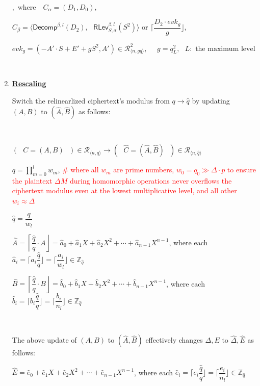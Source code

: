 \begin{tcolorbox}[title={\textbf{\tboxlabel{\ref*{subsubsec:ckks-mult-cipher-summary}} CKKS's Ciphertext-to-Ciphertext Multiplication}}]
\begin{enumerate}
$ $

$, \text{ where } \text{ } C_\alpha = (D
_1, D_0),$

\text{ }\text{ }\text{ }\text{ }\text{ }\text{ }\text{ }\text{ }\text{ } $C_\beta = \bm{\langle} \textsf{Decomp}^{\beta, l}(D_2), \text{ } \textsf{RLev}_{S, \sigma}^{\beta, l}( S^2) \bm{\rangle} \text{ or }   \Bigg\lceil\dfrac{D_2 \cdot \mathit{evk_g}}{g}\Bigg\rfloor$,

\text{ }\text{ }\text{ }\text{ }\text{ }\text{ }\text{ }\text{ }\text{ }  $\mathit{evk_g} = (-A'\cdot S + E' + g S^2, A') \in \mathcal{R}_{\langle n, gq\rangle}^2, \text{ } \text{ } g  = q_L^2, \text{ } L: \text{ the maximum level}$

$ $

\item \textbf{\underline{Rescaling}}

Switch the relinearlized ciphertext's modulus from $q \rightarrow \hat q$ 
by updating $(A, B)$ to $(\hat{A}, \hat B)$ as follows:

$ $

$(\text{ }C = (A, B)\text{ }) \in \mathcal{R}_{\langle n, q \rangle} \rightarrow (\text{ }\hat{C} = (\hat{A}, \hat{B})\text{ }) \in \mathcal{R}_{\langle n, \hat q \rangle}$ 

$q = \prod\limits_{m=0}^{l}w_m$, \textcolor{red}{ \text{ } \# where all $w_m$ are prime numbers,  $w_0 = q_0 \gg \Delta\cdot p$ to ensure the plaintext $\Delta M$ during homomorphic operations never overflows the ciphertext modulus even at the lowest multiplicative level, and all other $w_i \approx \Delta$}

$\hat{q} = \dfrac{q}{w_l}$

$\hat{A} = \left\lceil\dfrac{\hat q}{q}\cdot A\right\rfloor = \hat{a}_{0} + \hat{a}_{1}X + \hat{a}_{2}X^2 + \cdots + \hat{a}_{{n-1}}X^{n-1}$, where each $\hat{a}_{i} = \Big\lceil a_{i}\dfrac{\hat{q}}{q} \Big\rfloor = \Big\lceil \dfrac{a_{i}}{w_l} \Big\rfloor \in \mathbb{Z}_{\hat{q}}$ 


$\hat{B} = \left\lceil\dfrac{\hat q}{q}\cdot B\right\rfloor = \hat{b}_0 + \hat{b}_1X + \hat{b}_2X^2 + \cdots + \hat{b}_{n-1}X^{n-1}$, where each $\hat{b}_i = \Big\lceil b_i\dfrac{\hat{q}}{q} \Big\rfloor = \Big\lceil \dfrac{b_i}{n_l} \Big\rfloor \in \mathbb{Z}_{\hat{q}}$

$ $

The above update of $(A, B)$ to $(\hat{A}, \hat B)$ effectively changes $\Delta, E$ to $\hat\Delta, \hat E$ as follows:

$\hat{E} = \hat{e}_0 + \hat{e}_1X + \hat{e}_2X^2 + \cdots + \hat{e}_{n-1}X^{n-1}$, where each $\hat{e}_i = \Big\lceil e_i\dfrac{\hat{q}}{q} \Big\rfloor = \Big\lceil \dfrac{e_i}{n_l} \Big\rfloor \in \mathbb{Z}_{\hat{q}}$


\end{enumerate}
\end{tcolorbox}
